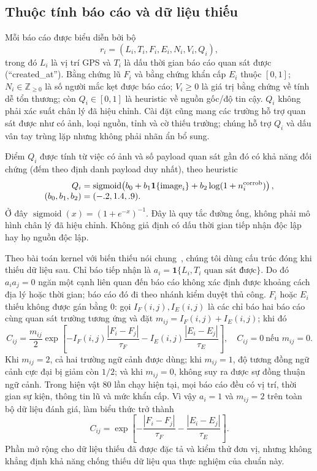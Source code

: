 \documentclass[runningheads]{llncs}
\begin{document}
\subsection{Thuộc tính báo cáo và dữ liệu thiếu}

Mỗi báo cáo được biểu diễn bởi bộ
\[
r_i=(L_i,T_i,F_i,E_i,N_i,V_i,Q_i),
\]
trong đó $L_i$ là vị trí GPS và $T_i$ là dấu thời gian báo cáo quan sát được
(``created\_at''). Bằng chứng lũ $F_i$ và bằng chứng khẩn cấp $E_i$ thuộc
$[0,1]$; $N_i\in\mathbb{Z}_{\geq0}$ là số người mắc kẹt được báo cáo;
$V_i\geq0$ là giá trị bằng chứng về tính dễ tổn thương; còn
$Q_i\in[0,1]$ là heuristic về nguồn gốc/độ tin cậy. $Q_i$ không phải xác
suất chân lý đã hiệu chỉnh. Cài đặt cũng mang các trường hỗ trợ quan sát được
như có ảnh, loại nguồn, tỉnh và cờ thiếu trường; chúng hỗ trợ $Q_i$ và dấu
vân tay trùng lặp nhưng không phải nhãn ẩn bổ sung.

Điểm $Q_i$ được tính từ việc có ảnh và số payload quan sát gần đó có khả năng
đối chứng (đếm theo định danh payload duy nhất), theo heuristic
\[
\begin{aligned}
Q_i&=\operatorname{sigmoid}\!\left(b_0+b_1\mathbf{1}\{\text{image}_i\}
 +b_2\log(1+n_i^{\rm corrob})\right),\\[-1mm]
(b_0,b_1,b_2)&=(-.2,1.4,.9).
\end{aligned}
\]
Ở đây $\operatorname{sigmoid}(x)=(1+e^{-x})^{-1}$. Đây là quy tắc đường
ống, không phải mô hình chân lý đã hiệu chỉnh. Không giả định có dấu thời
gian tiếp nhận độc lập hay họ nguồn độc lập.

Theo bài toán kernel với biến thiếu nói chung~\cite{smola2005missing},
chúng tôi dùng cấu trúc đóng khi thiếu dữ liệu sau. Chỉ báo tiếp nhận là
$a_i=\mathbf{1}\{L_i,T_i\text{ quan sát được}\}$. Do đó $a_i a_j=0$ ngăn
một cạnh liên quan đến báo cáo không xác định được khoảng cách địa lý hoặc
thời gian; báo cáo đó đi theo nhánh kiểm duyệt thủ công. $F_i$ hoặc $E_i$
thiếu không được gán bằng 0: gọi $I_F(i,j),I_E(i,j)$ là các chỉ báo hai báo
cáo cùng quan sát trường tương ứng và đặt $m_{ij}=I_F(i,j)+I_E(i,j)$; khi đó
\[
C_{ij}=\frac{m_{ij}}{2}\exp\!\left[-I_F(i,j)\frac{|F_i-F_j|}{\tau_F}
-I_E(i,j)\frac{|E_i-E_j|}{\tau_E}\right],
\quad C_{ij}=0\ \text{nếu }m_{ij}=0.
\]
Khi $m_{ij}=2$, cả hai trường ngữ cảnh được dùng; khi $m_{ij}=1$, độ tương
đồng ngữ cảnh cực đại bị giảm còn $1/2$; và khi $m_{ij}=0$, không suy ra
được sự đồng thuận ngữ cảnh. Trong hiện vật 80 lần chạy hiện tại, mọi báo
cáo đều có vị trí, thời gian sự kiện, thông tin lũ và mức khẩn cấp. Vì vậy
$a_i=1$ và $m_{ij}=2$ trên toàn bộ dữ liệu đánh giá, làm biểu thức trở thành
\[
C_{ij}=\exp\!\left[-\frac{|F_i-F_j|}{\tau_F}
-\frac{|E_i-E_j|}{\tau_E}\right].
\]
Phần mở rộng cho dữ liệu thiếu đã được đặc tả và kiểm thử đơn vị, nhưng không
khẳng định khả năng chống thiếu dữ liệu qua thực nghiệm của chuẩn này.
\end{document}

